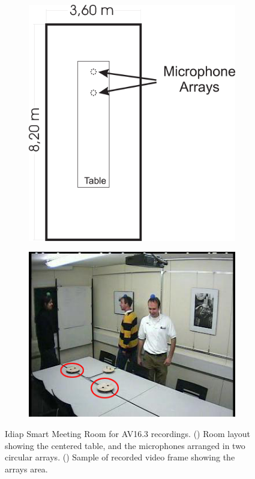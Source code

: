 \documentclass[spanish,openright]{book}
\begin{document}
\begin{figure}
\centering
\begin{subfigure}[b]{0.30\textwidth}
\includegraphics[width=\textwidth]{roomlayout2}
\caption{}
\label{fig:RoomLayout}
\end{subfigure}\qquad \qquad \begin{subfigure}[b]{0.425\textwidth}
\includegraphics[width=\textwidth]{idiap-seq45-cam2.jpg}
\caption{}
\label{fig:RoomPicture}
\end{subfigure}
\caption{Idiap Smart Meeting Room for AV16.3 recordings.
(\protect{}) Room layout showing the centered
table, and the microphones arranged in two circular arrays.
(\protect{}) Sample of recorded video frame
showing the arrays area. \vspace{-0.3cm}}
\label{fig:LIdiapRoom}
\end{figure}
\end{document}
